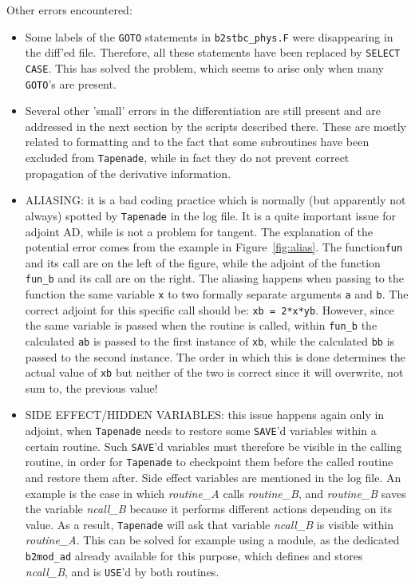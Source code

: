 Other errors encountered:
\begin{itemize}
  \item Some labels of the {\tt GOTO} statements in {\tt b2stbc\_phys.F} were disappearing in the diff'ed file. Therefore, all these statements have been replaced by {\tt SELECT CASE}. This has solved the problem, which seems to arise only when many {\tt GOTO}'s are present.

  \item Several other 'small' errors in the differentiation are still present and are addressed in the next section by the scripts described there. These are mostly related to formatting and to the fact that some subroutines have been excluded from {\tt Tapenade}, while in fact they do not prevent correct propagation of the derivative information.

  \item ALIASING: it is a bad coding practice which is normally (but apparently not always) spotted by {\tt Tapenade} in the log file. It is a quite important issue for adjoint AD, while is not a problem for tangent. The explanation of the potential error comes from the example in Figure~\ref{fig:alias}. The function{\tt fun} and its call are on the left of the figure, while the adjoint of the function {\tt fun\_b} and its call are on the right. The aliasing happens when passing to the function the same variable {\tt x} to two formally separate arguments {\tt a} and {\tt b}. The correct adjoint for this specific call should be: {\tt xb = 2*x*yb}. However, since the same variable is passed when the routine is called, within {\tt fun\_b} the calculated {\tt ab} is passed to the first instance of {\tt xb}, while the calculated {\tt bb} is passed to the second instance. The order in which this is done determines the actual value of {\tt xb} but neither of the two is correct since it will overwrite, not sum to, the previous value!

  \item SIDE EFFECT/HIDDEN VARIABLES: this issue happens again only in adjoint, when {\tt Tapenade} needs to restore some {\tt SAVE}'d variables within a certain routine. Such {\tt SAVE}'d variables must therefore be visible in the calling routine, in order for {\tt Tapenade} to checkpoint them before the called routine and restore them after. Side effect variables are mentioned in the log file. An example is the case in which \textit{routine\_A} calls \textit{routine\_B}, and 
  \textit{routine\_B} saves the variable \textit{ncall\_B} because it performs different actions depending on its value. As a result, {\tt Tapenade} will ask that variable \textit{ncall\_B} is visible within \textit{routine\_A}. This can be solved for example using a module, as the dedicated {\tt b2mod\_ad} already available for this purpose, which defines and stores \textit{ncall\_B}, and is {\tt USE}'d by both routines.


\end{itemize}
